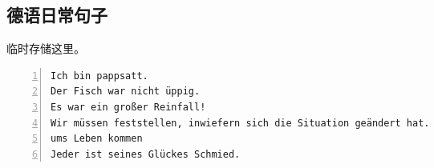 \documentclass[11pt]{amsart}
\begin{document}
\subsection{德语日常句子}
临时存储这里。
\begin{lstlisting}[numbers=left,numberstyle=\tiny,numbersep=10pt]
Ich bin pappsatt.
Der Fisch war nicht üppig.
Es war ein großer Reinfall!
Wir müssen feststellen, inwiefern sich die Situation geändert hat.
ums Leben kommen
Jeder ist seines Glückes Schmied.
\end{lstlisting}

 
   



 








\begin{thebibliography}{99}

 


  

\end{thebibliography}
\end{document}
